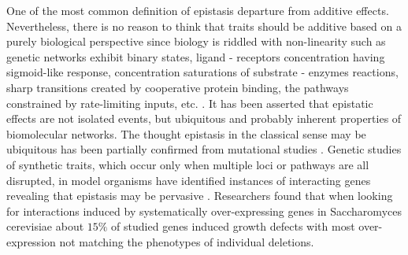 One of the most common definition of epistasis departure from additive effects.
Nevertheless, there is no reason to think that traits should be additive based on a purely biological perspective \cite{zuk2012mystery} since biology is riddled with non-linearity such as genetic networks exhibit binary states, ligand - receptors concentration having sigmoid-like response, concentration saturations of substrate - enzymes reactions, sharp transitions created by cooperative protein binding, the pathways constrained by rate-limiting inputs, etc. \cite{zuk2012mystery}. 
It has been asserted that epistatic effects are not isolated events, but ubiquitous \cite{tyler2009shadows} and probably inherent properties of biomolecular networks.
The thought epistasis in the classical sense may be ubiquitous has been partially confirmed from mutational studies \cite{phillips2008epistasis}.
Genetic studies of synthetic traits, which occur only when multiple loci or pathways are all disrupted, in model organisms have identified instances of interacting genes revealing that epistasis may be pervasive \cite{zuk2012mystery}. 
Researchers found \cite{phillips2008epistasis} that when looking for interactions induced by systematically over-expressing genes in Saccharomyces cerevisiae about $15\%$ of studied genes induced growth defects with most over-expression not matching the phenotypes of individual deletions.  


